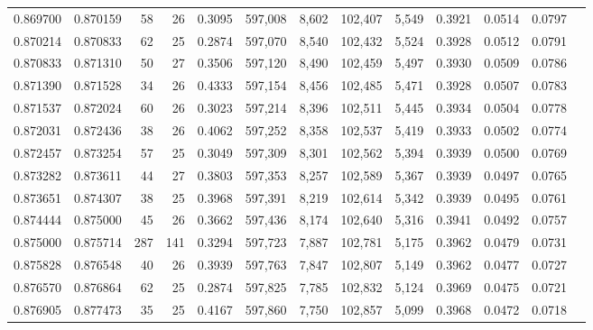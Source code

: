 \begin{tabular}{rrrrrrrrrrrrr}
0.869700 & 0.870159 &     58 &    26 &                                     0.3095 & 597,008 &   8,602 & 102,407 &   5,549 & 0.3921 & 0.0514 & 0.0797 \\
0.870214 & 0.870833 &     62 &    25 &                                     0.2874 & 597,070 &   8,540 & 102,432 &   5,524 & 0.3928 & 0.0512 & 0.0791 \\
0.870833 & 0.871310 &     50 &    27 &                                     0.3506 & 597,120 &   8,490 & 102,459 &   5,497 & 0.3930 & 0.0509 & 0.0786 \\
0.871390 & 0.871528 &     34 &    26 &                                     0.4333 & 597,154 &   8,456 & 102,485 &   5,471 & 0.3928 & 0.0507 & 0.0783 \\
0.871537 & 0.872024 &     60 &    26 &                                     0.3023 & 597,214 &   8,396 & 102,511 &   5,445 & 0.3934 & 0.0504 & 0.0778 \\
0.872031 & 0.872436 &     38 &    26 &                                     0.4062 & 597,252 &   8,358 & 102,537 &   5,419 & 0.3933 & 0.0502 & 0.0774 \\
0.872457 & 0.873254 &     57 &    25 &                                     0.3049 & 597,309 &   8,301 & 102,562 &   5,394 & 0.3939 & 0.0500 & 0.0769 \\
0.873282 & 0.873611 &     44 &    27 &                                     0.3803 & 597,353 &   8,257 & 102,589 &   5,367 & 0.3939 & 0.0497 & 0.0765 \\
0.873651 & 0.874307 &     38 &    25 &                                     0.3968 & 597,391 &   8,219 & 102,614 &   5,342 & 0.3939 & 0.0495 & 0.0761 \\
0.874444 & 0.875000 &     45 &    26 &                                     0.3662 & 597,436 &   8,174 & 102,640 &   5,316 & 0.3941 & 0.0492 & 0.0757 \\
0.875000 & 0.875714 &    287 &   141 &                                     0.3294 & 597,723 &   7,887 & 102,781 &   5,175 & 0.3962 & 0.0479 & 0.0731 \\
0.875828 & 0.876548 &     40 &    26 &                                     0.3939 & 597,763 &   7,847 & 102,807 &   5,149 & 0.3962 & 0.0477 & 0.0727 \\
0.876570 & 0.876864 &     62 &    25 &                                     0.2874 & 597,825 &   7,785 & 102,832 &   5,124 & 0.3969 & 0.0475 & 0.0721 \\
0.876905 & 0.877473 &     35 &    25 &                                     0.4167 & 597,860 &   7,750 & 102,857 &   5,099 & 0.3968 & 0.0472 & 0.0718 \\

\end{tabular}
